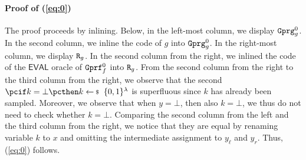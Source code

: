 \documentclass[a4paper,table,dvipsnames]{article}
\theoremstyle{definition}
\newcommand{\M}[1]{\ensuremath{\text{\texttt{#1}}}}
\renewcommand{\O}[1]{\ensuremath{\mathsf{#1}}}
\begin{document}
\paragraph{Proof of (\ref{eq:0})} The proof proceeds by inlining. Below, in the left-most column, we display $\M{Gprg}_g^0$. In the second column, we inline the code of $g$ into $\M{Gprg}_g^0$. In the right-most column, we display $\M{R}_g$. In the second column from the right, we inlined the code of the $\O{EVAL}$ oracle of
$\M{Gprf}_f^0$ into $\M{R}_g$. From the second column from the right to the third column from the right, we observe that the second $\pcif k=\bot\pcthen k\sample\bin^\lambda$ is superfluous since $k$ has already been sampled. Moreover, we observe that when $y=\bot$, then also $k=\bot$, we thus do not need to check whether
$k=\bot$. Comparing the second column from the left and the third column from the right, we notice that they are equal by renaming variable $k$ to $x$
and omitting the intermediate assignment to $y_\ell$ and $y_r$. Thus, (\ref{eq:0}) follows.
\end{document}
